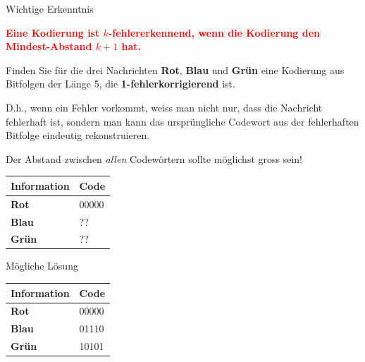 \begin{frame}[fragile]{Wichtige Erkenntnis}
    \begin{center}
        \textcolor{red}{\textbf{Eine Kodierung ist $k$-fehlererkennend, wenn die Kodierung den Mindest-Abstand $k+1$ hat.}}
    \end{center}
\end{frame}


\begin{frame}
    \begin{myexercise}
        Finden Sie für die drei Nachrichten \textbf{Rot}, \textbf{Blau} und \textbf{Grün} eine Kodierung aus Bitfolgen der Länge 5, die \textbf{1-fehlerkorrigierend} ist.

        D.h., wenn ein Fehler vorkommt, weiss man nicht nur, dass die Nachricht fehlerhaft ist, sondern man kann das ursprüngliche Codewort aus der fehlerhaften Bitfolge eindeutig rekonstruieren.

        Der Abstand zwischen \textit{allen} Codewörtern sollte möglichst gross sein!

        \begin{table}[H]
            \centering
            \begin{tabular}{>{\bfseries}l|l}
                Information & \textbf{Code}  \\ \midrule\midrule
                Rot         & 00000 \\ \midrule
                Blau        & ??    \\ \midrule
                Grün        & ??    \\
            \end{tabular}
        \end{table}
    \end{myexercise}
\end{frame}

\begin{frame}[fragile]{Mögliche Lösung}
    \begin{table}[H]
            \centering
            \begin{tabular}{>{\bfseries}l|l}
                Information & \textbf{Code}  \\ \midrule\midrule
                Rot         & 00000 \\ \midrule
                Blau        & 01110  \\ \midrule
                Grün        & 10101  \\
            \end{tabular}
        \end{table}
\end{frame}

